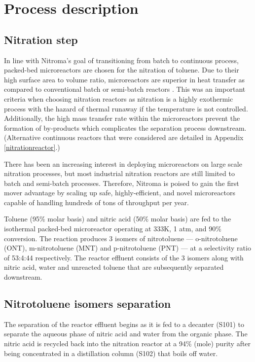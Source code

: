 \section{Process description}
\label{sec:process}
\subsection{Nitration step}
In line with Nitroma's goal of transitioning from batch to continuous process, packed-bed microreactors are chosen for the nitration of toluene. Due to their high surface area to volume ratio, microreactors are superior in heat transfer as compared to conventional batch or semi-batch reactors \cite{halder_nitration_2007}. This was an important criteria when choosing nitration reactors as nitration is a highly exothermic process with the hazard of thermal runaway if the temperature is not controlled. Additionally, the high mass transfer rate within the microreactors prevent the formation of by-products \cite{halder_nitration_2007} which complicates the separation process downstream.
(Alternative continuous reactors that were considered are detailed in Appendix \ref{nitrationreactor}.)

There has been an increasing interest in deploying microreactors on large scale nitration processes, but most industrial nitration reactors are still limited to batch and semi-batch processes. Therefore, Nitroma is poised to gain the first mover advantage by scaling up safe, highly-efficient, and novel microreactors capable of handling hundreds of tons of throughput per year.

Toluene (95\% molar basis) and nitric acid (50\% molar basis) are fed to the isothermal packed-bed microreactor operating at 333K, 1 atm, and 90\% conversion. The reaction produces 3 isomers of nitrotoluene --- o-nitrotoluene (ONT), m-nitrotoluene (MNT) and p-nitrotoluene (PNT) --- at a selectivity ratio of 53:4:44 respectively. The reactor effluent consists of the 3 isomers along with nitric acid, water and unreacted toluene that are subsequently separated downstream.

\subsection{Nitrotoluene isomers separation}
The separation of the reactor effluent begins as it is fed to a decanter (S101) to separate the aqueous phase of nitric acid and water from the organic phase. The nitric acid is recycled back into the nitration reactor at a 94\% (mole) purity after being concentrated in a distillation column (S102) that boils off water.

